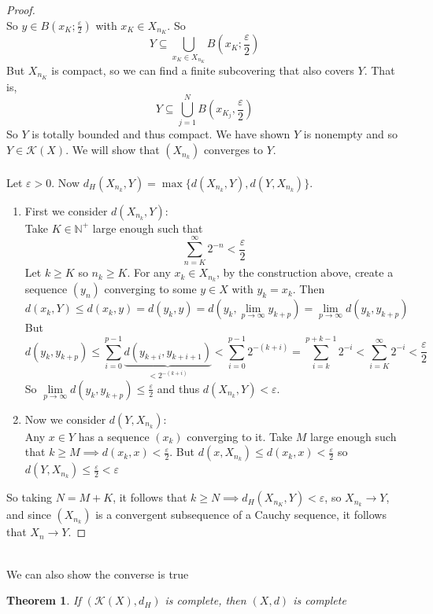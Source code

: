 \documentclass{article}
\theoremstyle{plain}
\newtheorem{thm}{Theorem}[section]
\theoremstyle{definition}
\theoremstyle{remark}
\begin{document}
\begin{proof}
\[\]
So $y \in B(x_K; \frac{\varepsilon}{2})$ with $x_K \in X_{n_K}$. So \[
Y \subseteq \bigcup \limits _{x_K \in X_{n_K}} B\left (x_{K}; \frac{\varepsilon}{2} \right )
\]
But $X_{n_K}$ is compact, so we can find a finite subcovering that also covers $Y$. That is, \[
Y \subseteq \bigcup \limits _{j=1}^{N} B \left (x_{K_j}, \frac{\varepsilon}{2} \right )
\]
So $Y$ is totally bounded and thus compact. We have shown $Y$ is nonempty and so $Y \in \mathcal{K}(X)$. We will show that $(X_{n_k}) $ converges to $Y$. \\ ~\\ Let $\varepsilon > 0$. Now $d_H(X_{n_k}, Y) = \max\{d(X_{n_k}, Y), d(Y, X_{n_k})\}$. 
\begin{enumerate}[label=(\arabic*)]
    \item First we consider $d(X_{n_k}, Y):$ \\ Take $K \in \mathbb{N}^+$ large enough such that \[\sum \limits_{n=K}^\infty 2^{-n}<\frac{\varepsilon}{2}\]
    Let $k \ge K $ so $n_k \ge K$. For any $x_{k} \in X_{n_k}$, by the construction above, create a sequence $(y_n)$ converging to some $y \in X$ with $y_k = x_k$. Then \[d(x_k, Y) \le d(x_k, y)=d(y_k, y) = d(y_k,\lim \limits _{p \to \infty}y_{k+p})=\lim \limits _{p \to \infty} d(y_k, y_{k+p}) \]  But \[d(y_k, y_{k+p})\le \sum \limits _{i=0}^{p-1} \underbrace{d(y_{k+i}, y_{k+i+1})}_{{< 2^{-(k+i)}}} <\sum \limits _{i=0}^{p-1} 2^{-(k+i)} = \sum \limits _{i=k}^{p+k-1}2^{-i } < \sum \limits _{i=K}^{\infty} 2^{-i} < \frac{\varepsilon}{2}\]So $\lim \limits _{p \to \infty} d(y_k, y_{k+p}) \le \frac{\varepsilon}{2} $ and thus $d(X_{n_k}, Y) < \varepsilon$.

    \item  Now we consider $d(Y, X_{n_k}):$ \\  Any $x\in Y$ has a sequence $(x_k)$ converging to it. Take $M$ large enough such that $k\ge M \implies d(x_k, x)< \frac{\varepsilon}{2}$. But $d(x, X_{n_k})\le d(x_k, x)<\frac{\varepsilon}{2}$ so $d(Y, X_{n_k}) \le \frac{\varepsilon}{2} < \varepsilon$
\end{enumerate}
So taking $N = M+K$, it follows that $k \ge N \implies d_H(X_{n_K}, Y)<\varepsilon$, so $X_{n_k} \to Y$, and since $(X_{n_k})$ is a convergent subsequence of a Cauchy sequence, it follows that $X_n \to Y$.
\end{proof}
~\\We can also show the converse is true
\begin{thm}
    If $(\mathcal{K}(X), d_H)$ is complete, then $(X, d)$ is complete 
\end{thm}
\end{document}
